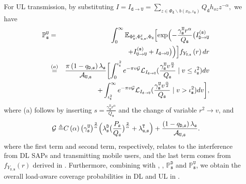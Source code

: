 \documentclass[twocolumn,english]{IEEEtran}
\theoremstyle{plain}
\theoremstyle{definition}
\begin{document}
For UL transmission, by substituting $I=I_{\mathtt{d\rightarrow U}}=\sum_{z\in\Phi_{\mathtt{d}}\backslash b\left(x_{0},\iota_{\mathtt{s}}\right)}Q_{\mathtt{d}}h_{oz}z^{-\alpha},$
we have
\begin{eqnarray*}
\mathbb{P}_{\mathtt{s}}^{\mathtt{U}} & = & \int_{0}^{\infty}\mathbb{E}_{\Phi_{\mathtt{s}}^{\mathtt{D}},\Phi_{\mathtt{u},\mathtt{s}}^{\mathtt{T}},\Phi_{\mathtt{d}}}\Bigl[\exp\Bigl(-\frac{\gamma_{\mathtt{s}}^{\mathtt{U}}r^{\alpha}}{Q_{\mathtt{s}}}\bigl(I_{\mathtt{D\rightarrow U}}^{\mathtt{(s)}}\\
 &  & +I_{\mathtt{U\rightarrow U}}^{\mathtt{(s)}}+I_{\mathtt{d\rightarrow U}}\bigr)\Bigr)\Bigr]f_{Y_{\mathtt{U,s}}}\left(r\right)dr\\
 & \overset{(a)}{=} & \frac{\pi\left(1-q_{\mathtt{D,s}}\right)\lambda_{\mathtt{s}}}{\mathcal{A}_{\mathtt{U,s}}}\biggl[\int_{0}^{\iota_{\mathtt{s}}^{2}}e^{-\pi v\mathcal{G}}\mathcal{L}_{I_{\mathtt{d\rightarrow U}}}(\frac{\gamma_{\mathtt{s}}^{\mathtt{U}}v^{\frac{\alpha}{2}}}{Q_{\mathtt{s}}}\mid v\leq\iota_{\mathtt{s}}^{2})dv\\
 &  & +\int_{\iota_{\mathtt{s}}^{2}}^{\infty}e^{-\pi v\mathcal{G}}\mathcal{L}_{I_{\mathtt{d\rightarrow U}}}(\frac{\gamma_{\mathtt{s}}^{\mathtt{U}}v^{\frac{\alpha}{2}}}{Q_{\mathtt{s}}}\mid v>\iota_{\mathtt{s}}^{2})dv\biggr],
\end{eqnarray*}
where (a) follows by inserting $s=\frac{\gamma_{\mathtt{s}}^{\mathtt{U}}r^{\alpha}}{Q_{\mathtt{s}}}$
and the change of variable $r^{2}\rightarrow v$, and
\begin{equation}
\mathcal{G\triangleq}C\left(\alpha\right)\bigl(\gamma_{\mathtt{s}}^{\mathtt{U}}\bigr)^{\frac{2}{\alpha}}\Bigl(\lambda_{\mathtt{s}}^{\mathtt{D}}\bigl(\frac{P_{\mathtt{s}}}{Q_{\mathtt{s}}}\bigr)^{\frac{2}{\alpha}}+\lambda_{\mathtt{u,s}}^{\mathtt{T}}\Bigr)+\frac{\left(1-q_{\mathtt{D,s}}\right)\lambda_{\mathtt{s}}}{\mathcal{A}_{\mathtt{U,s}}}.\label{eq:G}
\end{equation}
where the first term and second term, respectively, relates to the
interference from DL SAPs and transmitting mobile users, and the last
term comes from $f_{Y_{\mathtt{U,s}}}\left(r\right)$ derived in .
Furthermore, combining  with ,
, $\mathbb{P}_{\mathtt{s}}^{\mathtt{D}}$ and
$\mathbb{P}_{\mathtt{s}}^{\mathtt{U}}$, we obtain the overall load-aware
coverage probabilities in DL and UL in .
\end{document}
